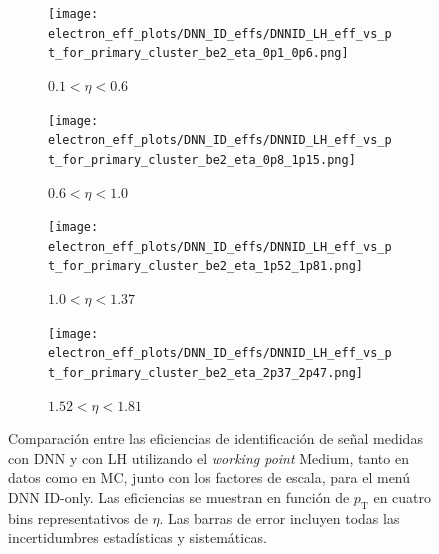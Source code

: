 \begin{figure}[h]
  \centering

  \begin{subfigure}[b]{0.48\textwidth}
    \centering
    \texttt{[image: electron\_eff\_plots/DNN\_ID\_effs/DNNID\_LH\_eff\_vs\_pt\_for\_primary\_cluster\_be2\_eta\_0p1\_0p6.png]}
    \caption{$0.1 < \eta < 0.6$}
    \label{res:eff_dnn_lh_etabin1}
  \end{subfigure}
  \hfill
  \begin{subfigure}[b]{0.48\textwidth}
    \centering
    \texttt{[image: electron\_eff\_plots/DNN\_ID\_effs/DNNID\_LH\_eff\_vs\_pt\_for\_primary\_cluster\_be2\_eta\_0p8\_1p15.png]}
    \caption{$0.6 < \eta < 1.0$}
    \label{res:eff_dnn_lh_etabin2}
  \end{subfigure}

  \vspace{0.5cm}

  \begin{subfigure}[b]{0.48\textwidth}
    \centering
    \texttt{[image: electron\_eff\_plots/DNN\_ID\_effs/DNNID\_LH\_eff\_vs\_pt\_for\_primary\_cluster\_be2\_eta\_1p52\_1p81.png]}
    \caption{$1.0 < \eta < 1.37$}
    \label{res:eff_dnn_lh_etabin3}
  \end{subfigure}
  \hfill
  \begin{subfigure}[b]{0.48\textwidth}
    \centering
    \texttt{[image: electron\_eff\_plots/DNN\_ID\_effs/DNNID\_LH\_eff\_vs\_pt\_for\_primary\_cluster\_be2\_eta\_2p37\_2p47.png]}
    \caption{$1.52 < \eta < 1.81$}
    \label{res:eff_dnn_lh_etabin4}
  \end{subfigure}

  \caption{
    Comparación entre las eficiencias de identificación de señal medidas con DNN y con LH utilizando el \textit{working point} Medium, 
    tanto en datos como en MC, junto con los factores de escala, para el menú DNN ID-only. 
    Las eficiencias se muestran en función de $p_{\mathrm{T}}$ en cuatro bins representativos de $\eta$. 
    Las barras de error incluyen todas las incertidumbres estadísticas y sistemáticas.}
  \label{res:eff_sfs_dnn_vs_lh_pt_4etabins}
\end{figure}

